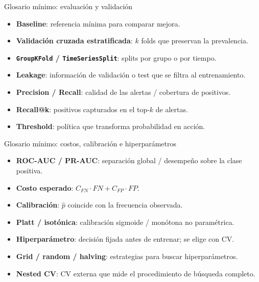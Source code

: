 \documentclass[aspectratio=169,12pt]{beamer}
\begin{document}
\begin{frame}{Glosario mínimo: evaluación y validación}
  \small
  \begin{itemize}
    \item \textbf{Baseline}: referencia mínima para comparar mejora.
    \item \textbf{Validación cruzada estratificada}: $k$ folds que preservan la prevalencia.
    \item \textbf{\texttt{GroupKFold} / \texttt{TimeSeriesSplit}}: splits por grupo o por tiempo.
    \item \textbf{Leakage}: información de validación o test que se filtra al entrenamiento.
    \item \textbf{Precision / Recall}: calidad de las alertas / cobertura de positivos.
    \item \textbf{Recall@k}: positivos capturados en el top-$k$ de alertas.
    \item \textbf{Threshold}: política que transforma probabilidad en acción.
  \end{itemize}
\end{frame}

\begin{frame}{Glosario mínimo: costos, calibración e hiperparámetros}
  \small
  \begin{itemize}
    \item \textbf{ROC-AUC / PR-AUC}: separación global / desempeño sobre la clase positiva.
    \item \textbf{Costo esperado}: $C_{FN}\cdot FN + C_{FP}\cdot FP$.
    \item \textbf{Calibración}: $\hat{p}$ coincide con la frecuencia observada.
    \item \textbf{Platt / isotónica}: calibración sigmoide / monótona no paramétrica.
    \item \textbf{Hiperparámetro}: decisión fijada antes de entrenar; se elige con CV.
    \item \textbf{Grid / random / halving}: estrategias para buscar hiperparámetros.
    \item \textbf{Nested CV}: CV externa que mide el procedimiento de búsqueda completo.
  \end{itemize}
\end{frame}
\end{document}
